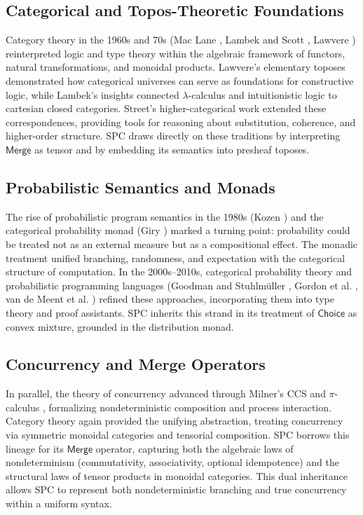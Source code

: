 \documentclass{article}
\begin{document}
\subsection{Categorical and Topos-Theoretic Foundations}
Category theory in the 1960s and 70s (Mac Lane \cite{maclane1963natural}, Lambek and Scott \cite{lambek1986categorical}, 
Lawvere \cite{lawvere1970quantifiers}) reinterpreted logic and type theory within the 
algebraic framework of functors, natural transformations, and monoidal products. 
Lawvere’s elementary toposes demonstrated how categorical universes can serve as 
foundations for constructive logic, while Lambek’s insights connected $\lambda$-calculus 
and intuitionistic logic to cartesian closed categories. Street’s higher-categorical work 
\cite{street1972two} extended these correspondences, providing tools for reasoning about 
substitution, coherence, and higher-order structure. SPC draws directly on these traditions 
by interpreting $\mathsf{Merge}$ as tensor and by embedding its semantics into presheaf toposes.

\subsection{Probabilistic Semantics and Monads}
The rise of probabilistic program semantics in the 1980s (Kozen \cite{kozen1981semantics}) 
and the categorical probability monad (Giry \cite{giry1982categorical}) marked a turning 
point: probability could be treated not as an external measure but as a compositional effect. 
The monadic treatment unified branching, randomness, and expectation with the categorical 
structure of computation. In the 2000s–2010s, categorical probability theory and probabilistic 
programming languages (Goodman and Stuhlmüller \cite{goodman2014design}, 
Gordon et al. \cite{gordon2014probabilistic}, van de Meent et al. \cite{van2018introduction}) 
refined these approaches, incorporating them into type theory and proof assistants. 
SPC inherits this strand in its treatment of $\mathsf{Choice}$ as convex mixture, grounded 
in the distribution monad.

\subsection{Concurrency and Merge Operators}
In parallel, the theory of concurrency advanced through Milner’s CCS and $\pi$-calculus 
\cite{milner1980calculus,milner1999communicating}, formalizing nondeterministic composition 
and process interaction. Category theory again provided the unifying abstraction, treating 
concurrency via symmetric monoidal categories and tensorial composition. SPC borrows this 
lineage for its $\mathsf{Merge}$ operator, capturing both the algebraic laws of nondeterminism 
(commutativity, associativity, optional idempotence) and the structural laws of tensor products 
in monoidal categories. This dual inheritance allows SPC to represent both nondeterministic 
branching and true concurrency within a uniform syntax.
\end{document}
